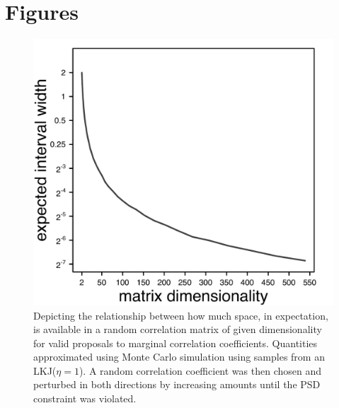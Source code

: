 \documentclass[10pt]{article}
\begin{document}
\clearpage

\section{Figures}

\begin{figure}[h]
\centering
\includegraphics[width=145mm]{figures/expected_wiggle_room.pdf}
\caption[Expected Valid Sliding Window Width for Correlation Matrix Across Dimensions]{Depicting the relationship between how much space, in expectation, is available in a random correlation matrix of given dimensionality for valid proposals to marginal correlation coefficients. Quantities approximated using Monte Carlo simulation using samples from an LKJ($\eta = 1$). A random correlation coefficient was then chosen and perturbed in both directions by increasing amounts until the PSD constraint was violated. \label{overflow}
\label{fig:expWiggleRoom}}
\end{figure}
\end{document}
